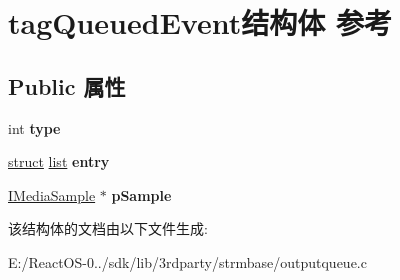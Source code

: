 \hypertarget{structtag_queued_event}{}\section{tag\+Queued\+Event结构体 参考}
\label{structtag_queued_event}
\subsection*{Public 属性}
\begin{DoxyCompactItemize}
\item 
\mbox{\label{structtag_queued_event_ad3d541b516531881a84743857081912b}} 
int {\bfseries type}
\item 
\mbox{\label{structtag_queued_event_a7c6f554419af9de53f1f7f96fa506707}} 
\hyperlink{interfacestruct}{struct} \hyperlink{classlist}{list} {\bfseries entry}
\item 
\mbox{\label{structtag_queued_event_aa8dbed777a4da741c5b659bd20584a47}} 
\hyperlink{interface_i_media_sample}{I\+Media\+Sample} $\ast$ {\bfseries p\+Sample}
\end{DoxyCompactItemize}


该结构体的文档由以下文件生成\+:\begin{DoxyCompactItemize}
\item 
E\+:/\+React\+O\+S-\/0../sdk/lib/3rdparty/strmbase/outputqueue.\+c\end{DoxyCompactItemize}
